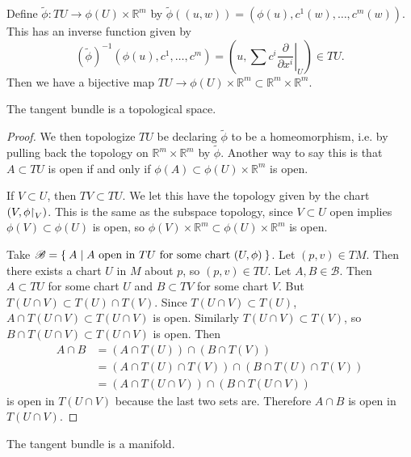 Define $\tilde{\phi}: TU \to \phi(U) \times \mathbb{R}^m$ by
$\tilde{\phi}((u, w)) = (\phi(u), c^1(w), \dots, c^m(w))$.
This has an inverse function given by
$$
(\tilde{\phi})^{-1}(\phi(u), c^1, \dots, c^m)
= (u, \sum c^i \left.\frac{\partial}{\partial x^i}\right|_U)
\in TU.
$$
Then we have a bijective map
$TU \to \phi(U) \times \mathbb{R}^m \subset \mathbb{R}^m \times
\mathbb{R}^m$.

\begin{prop}
The tangent bundle is a topological space.
\end{prop}

\begin{proof}
We then topologize $TU$ be declaring $\tilde{\phi}$ to be a
homeomorphism, i.e. by pulling back the topology on
$\mathbb{R}^m \times \mathbb{R}^m$ by $\tilde{\phi}$. Another way to
say this is that $A \subset TU$ is open if and only if
$\phi(A) \subset \phi(U) \times \mathbb{R}^m$ is open.

If $V \subset U$, then $TV \subset TU$. We let this have the topology
given by the chart $(V, \phi\mathord{\upharpoonright}_V)$. This is the same as the
subspace topology, since $V \subset U$ open implies
$\phi(V) \subset \phi(U)$ is open, so
$\phi(V) \times \mathbb{R}^m \subset \phi(U) \times \mathbb{R}^m$ is
open.

Take $\mathscr{B} = \Set{ A | A \text{ open in $TU$ for some chart
  $(U , \phi)$} }$. Let $(p, v) \in TM$.
Then there exists a chart $U$ in $M$ about $p$, so $(p, v) \in TU$.
Let $A, B \in \mathscr{B}$. Then $A \subset TU$ for some chart $U$
and $B \subset TV$ for some chart $V$.
But $T(U \cap V) \subset T(U) \cap T(V)$.
Since $T(U \cap V) \subset T(U)$,
$A \cap T(U \cap V) \subset T(U \cap V)$ is open. Similarly
$T(U \cap V) \subset T(V)$, so
$B \cap T(U \cap V) \subset T(U \cap V)$ is open. Then
\begin{align*}
   A \cap B
&= (A \cap T(U)) \cap (B \cap T(V)) \\
&= (A \cap T(U) \cap T(V)) \cap (B \cap T(U) \cap T(V)) \\
&= (A \cap T(U \cap V)) \cap (B \cap T(U \cap V))
\end{align*}
is open in $T(U \cap V)$ because the last two sets are. Therefore
$A \cap B$ is open in $T(U \cap V)$.
\end{proof}

\begin{prop}
The tangent bundle is a manifold.
\end{prop}

